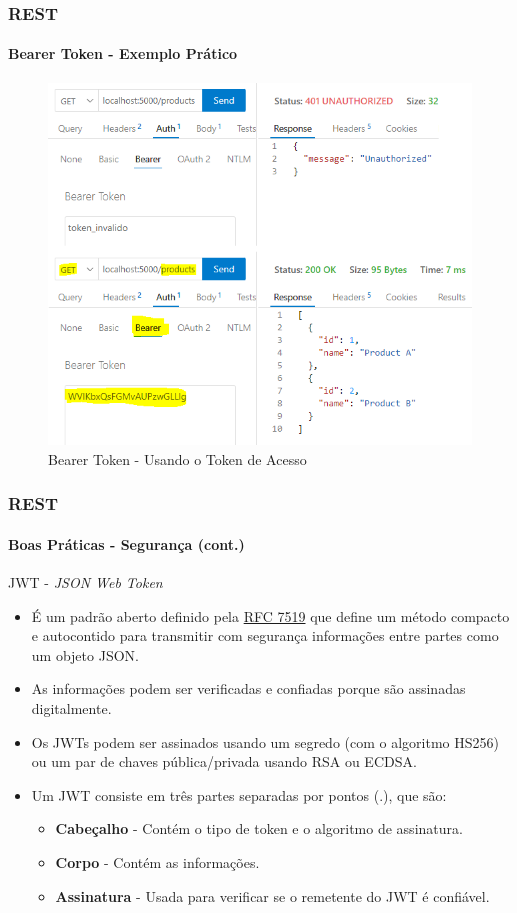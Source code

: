 \documentclass[
	9pt, %
	t, %
]{beamer}
\begin{document}
\begin{frame}
	\frametitle{REST}
	\framesubtitle{Bearer Token - Exemplo Prático}

	\begin{figure}
		\includegraphics[width=0.7\linewidth]{bearer_products.png}
		\caption{Bearer Token - Usando o Token de Acesso}
		\label{fig:bearer_token_usando}
	\end{figure}

\end{frame}

\begin{frame}
	\frametitle{REST}
	\framesubtitle{Boas Práticas - Segurança (cont.)}

	\begin{block}{JWT - \textit{JSON Web Token}}
		\begin{itemize}
			\item É um padrão aberto definido pela \href{https://datatracker.ietf.org/doc/html/rfc7519}{RFC 7519} que define um método compacto e autocontido para transmitir com segurança informações entre partes como um objeto JSON.
			\item As informações podem ser verificadas e confiadas porque são assinadas
			      digitalmente.
			\item Os JWTs podem ser assinados usando um segredo (com o algoritmo HS256) ou um par
			      de chaves pública/privada usando RSA ou ECDSA.
			\item Um JWT consiste em três partes separadas por pontos (.), que são:
			      \begin{itemize}
				      \item \textbf{Cabeçalho} - Contém o tipo de token e o algoritmo de assinatura.
				      \item \textbf{Corpo} - Contém as informações.
				      \item \textbf{Assinatura} - Usada para verificar se o remetente do JWT é confiável.
			      \end{itemize}
		\end{itemize}
	\end{block}

\end{frame}
\end{document}
